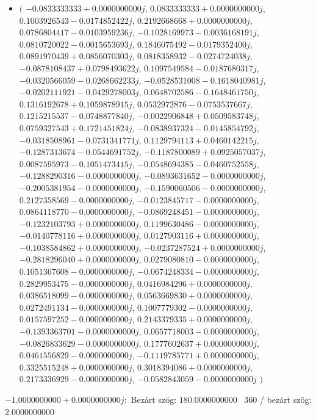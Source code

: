 \documentclass[14pt,a4paper]{article}
\begin{document}
\begin{itemize}
\item
$\big($
$-0.0833333333+0.0000000000j$, $0.0833333333+0.0000000000j$, $0.1003926543-0.0174852422j$, $0.2192668668+0.0000000000j$, $0.0786804417-0.0103959236j$, $-0.1028169973-0.0036168191j$, $0.0810720022-0.0015653693j$, $0.1846075492-0.0179352400j$, $0.0891970439+0.0856070303j$, $0.0818358932-0.0274724038j$, $-0.0878108437+0.0798493622j$, $0.1097549584-0.0187680317j$, $-0.0320566059-0.0268662233j$, $-0.0528531008-0.1618040981j$, $-0.0202111921-0.0429278003j$, $0.0648702586-0.1648461750j$, $0.1316192678+0.1059878915j$, $0.0532972876-0.0753537667j$, $0.1215215537-0.0748877840j$, $-0.0022906848+0.0509583748j$, $0.0759327543+0.1721451824j$, $-0.0838937324-0.0145854792j$, $-0.0318508961-0.0731341771j$, $0.1129794113+0.0460142215j$, $-0.1287313674-0.0544691752j$, $-0.1187800089+0.0925057037j$, $0.0087595973-0.1051473415j$, $-0.0548694385-0.0460752558j$, $-0.1288290316-0.0000000000j$, $-0.0893631652-0.0000000000j$, $-0.2005381954-0.0000000000j$, $-0.1590060506-0.0000000000j$, $0.2127358569-0.0000000000j$, $-0.0123845717-0.0000000000j$, $0.0864118770-0.0000000000j$, $-0.0869248451-0.0000000000j$, $-0.1232103793+0.0000000000j$, $0.1199630486-0.0000000000j$, $-0.0140778116+0.0000000000j$, $0.0127903116+0.0000000000j$, $-0.1038584862+0.0000000000j$, $-0.0237287524+0.0000000000j$, $-0.2818296040+0.0000000000j$, $0.0279080810-0.0000000000j$, $0.1051367608-0.0000000000j$, $-0.0674248334-0.0000000000j$, $0.2829953475-0.0000000000j$, $0.0416984296+0.0000000000j$, $0.0386518099-0.0000000000j$, $0.0563669830+0.0000000000j$, $0.0272491134-0.0000000000j$, $0.1007779302-0.0000000000j$, $0.0157597252-0.0000000000j$, $0.2143379335+0.0000000000j$, $-0.1393363701-0.0000000000j$, $0.0657718003-0.0000000000j$, $-0.0826833629-0.0000000000j$, $0.1777602637+0.0000000000j$, $0.0461556829-0.0000000000j$, $-0.1119785771+0.0000000000j$, $0.3325515248+0.0000000000j$, $0.3018394086+0.0000000000j$, $0.2173336929-0.0000000000j$, $-0.0582843059-0.0000000000j$
$\big)$
\end{itemize}
$-1.0000000000+0.0000000000j$:\
Bezárt szög: $180.0000000000$ \
360 / bezárt szög: $2.0000000000$\
\end{document}
